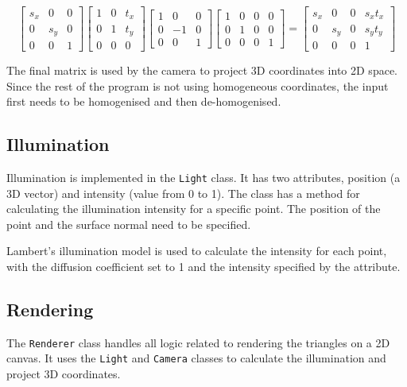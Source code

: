 \documentclass[]{article}
\begin{document}
\[
  \begin{bmatrix}
    s_x & 0 & 0 \\
    0 & s_y & 0 \\
    0 & 0 & 1
  \end{bmatrix}
  \begin{bmatrix}
    1 & 0 & t_x \\
    0 & 1 & t_y \\
    0 & 0 & 0
  \end{bmatrix}
  \begin{bmatrix}
    1 & 0 & 0 \\
    0 & -1 & 0 \\
    0 & 0 & 1
  \end{bmatrix}
  \begin{bmatrix}
    1 & 0 & 0 & 0 \\
    0 & 1 & 0 & 0 \\
    0 & 0 & 0 & 1
  \end{bmatrix}
  =
  \begin{bmatrix}
    s_x & 0 & 0 & s_x t_x \\
    0 & s_y & 0 & s_y t_y \\
    0 & 0 & 0 & 1
  \end{bmatrix}
\]

The final matrix is used by the camera to project 3D coordinates into 2D space. Since the rest of the program is not using homogeneous coordinates, the input first needs to be homogenised and then de-homogenised.

\subsection{Illumination}

Illumination is implemented in the \texttt{Light} class. It has two attributes, position (a 3D vector) and intensity (value from 0 to 1). The class has a method for calculating the illumination intensity for a specific point. The position of the point and the surface normal need to be specified.

Lambert's illumination model is used to calculate the intensity for each point, with the diffusion coefficient set to 1 and the intensity specified by the attribute.

\subsection{Rendering}

The \texttt{Renderer} class handles all logic related to rendering the triangles on a 2D canvas. It uses the \texttt{Light} and \texttt{Camera} classes to calculate the illumination and project 3D coordinates.
\end{document}
